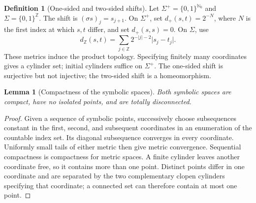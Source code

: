 \documentclass[11pt,oneside]{book}
\newtheorem{lemma}[theorem]{Lemma}
\theoremstyle{definition}
\newtheorem{definition}[theorem]{Definition}
\theoremstyle{remark}\newtheorem{remark}[theorem]{Remark}
\newcommand{\N}{\mathbb N}\newcommand{\Z}{\mathbb Z}\newcommand{\Q}{\mathbb Q}
\newcommand{\abs}[1]{\lvert#1\rvert}\newcommand{\norm}[1]{\lVert#1\rVert}
\begin{document}
\begin{definition}[One-sided and two-sided shifts]\label{d13:17:shift-definition}
Let \(\Sigma^+=\{0,1\}^{\N_0}\) and \(\Sigma=\{0,1\}^{\Z}\).
The shift is \((\sigma s)_j=s_{j+1}\).
On \(\Sigma^+\), set \(d_+(s,t)=2^{-N}\), where \(N\) is the first
index at which \(s,t\) differ, and set \(d_+(s,s)=0\).
On \(\Sigma\), use
\[
 d_{\Z}(s,t)=\sum_{j\in\Z}2^{-\abs{j}-2}\abs{s_j-t_j}.
\]
These metrics induce the product topology. Specifying finitely many
coordinates gives a cylinder set; initial cylinders suffice on
\(\Sigma^+\). The one-sided shift is surjective but not injective;
the two-sided shift is a homeomorphism.
\end{definition}

\begin{lemma}[Compactness of the symbolic spaces]\label{d13:17:shift-compactness}
Both symbolic spaces are compact, have no isolated points, and are
totally disconnected.
\end{lemma}
\begin{proof}
Given a sequence of symbolic points, successively choose subsequences
constant in the first, second, and subsequent coordinates in an
enumeration of the countable index set. Its diagonal subsequence
converges in every coordinate. Uniformly small tails of either metric
then give metric convergence. Sequential compactness is compactness
for metric spaces. A finite cylinder leaves another coordinate free,
so it contains more than one point. Distinct points differ in one
coordinate and are separated by the two complementary clopen
cylinders specifying that coordinate; a connected set can therefore
contain at most one point.
\end{proof}
\end{document}
